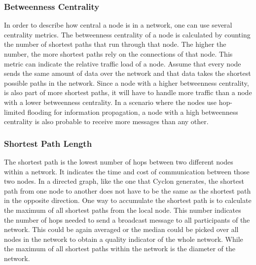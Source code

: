 \subsubsection{Betweenness Centrality}
In order to describe how central a node is in a network, one can use several
centrality metrics. The betweenness centrality \cite{freeman1977set} of a node
is calculated by counting the number of shortest paths that run through that
node. The higher the number, the more shortest paths rely on the connections of
that node. This metric can indicate the relative traffic load of a node. Assume
that every node sends the same amount of data over the network and that data
takes the shortest possible paths in the network. Since a node with a higher betweenness
centrality, is also part of more shortest paths, it will have to handle more
traffic than a node with a lower betweenness centrality. In a scenario where the
nodes use hop-limited flooding for information propagation, a node with a high
betweenness centrality is also probable to receive more messages than any other.

\subsubsection{Shortest Path Length}
The shortest path is the lowest number of hops between two different nodes
within a network. It indicates the time and cost of communication between those
two nodes. In a directed graph, like the one that Cyclon generates, the shortest
path from one node to another does not have to be the same as the shortest path in
the opposite direction. One way to accumulate the shortest path is to calculate
the maximum of all shortest paths from the local node. This number indicates
the number of hops needed to send a broadcast message to all participants of
the network. This could be again averaged or the median could be picked over
all nodes in the network to obtain a quality indicator of the whole network.
While the maximum of all shortest paths within the network is the diameter of
the network.

